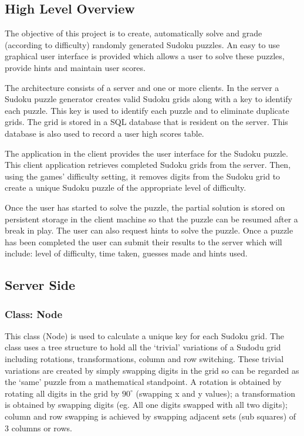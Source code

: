 \documentclass[fleqn]{article}
\begin{document}
\subsection{High Level Overview}

The objective of this project is to create, automatically solve and grade (according to difficulty) randomly generated Sudoku puzzles. An easy to use graphical user interface is provided which allows a user to solve these puzzles, provide hints and maintain user scores. 

The architecture consists of a server and one or more clients. In the server a Sudoku puzzle generator creates valid Sudoku grids along with a key to identify each puzzle. This key is used to identify each puzzle and to eliminate duplicate grids. The grid is stored in a SQL database that is resident on the server. This database is also used to record a user high scores table.

The application in the client provides the user interface for the Sudoku puzzle. This client application retrieves completed Sudoku grids from the server. Then, using the games’ difficulty setting, it removes digits from the Sudoku grid to create a unique Sudoku puzzle of the appropriate level of difficulty. 

Once the user has started to solve the puzzle, the partial solution is stored on persistent storage in the client machine so that the puzzle can be resumed after a break in play.  The user can also request hints to solve the puzzle. Once a puzzle has been completed the user can submit their results to the server which will include: level of difficulty, time taken, guesses made and hints used.

\subsection{Server Side}

\subsubsection{Class: Node}
This class (Node) is used to calculate a unique key for each Sudoku grid. The class uses a tree structure to hold all the ‘trivial’ variations of a Sudodu grid including rotations, transformations, column and row switching. These trivial variations are created by simply swapping digits in the grid so can be regarded as the ‘same’ puzzle from a mathematical standpoint. A rotation is obtained by rotating all digits in the grid by $90^\circ$ (swapping x and y values); a transformation is obtained by swapping digits (eg. All one digits swapped with all two digits); column and row swapping is achieved by swapping adjacent sets (sub squares) of 3 columns or rows.
\end{document}
